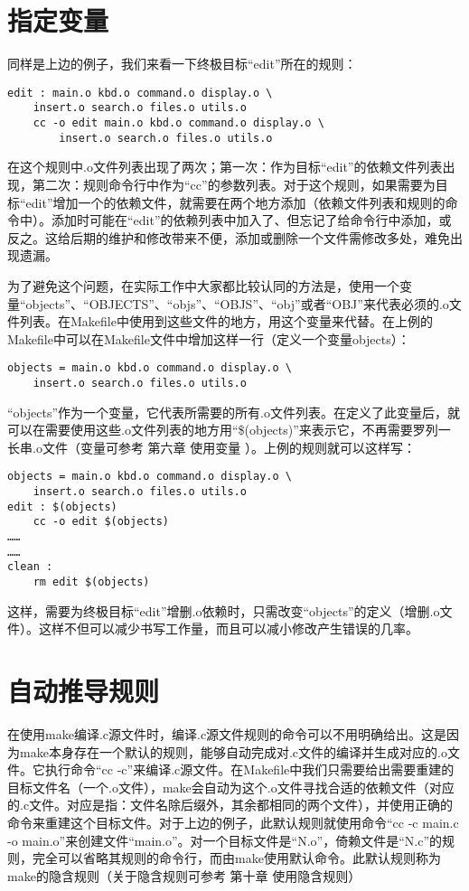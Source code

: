 \section{指定变量}
同样是上边的例子，我们来看一下终极目标“edit”所在的规则：

\begin{Verbatim}[]
edit : main.o kbd.o command.o display.o \
    insert.o search.o files.o utils.o
    cc -o edit main.o kbd.o command.o display.o \
        insert.o search.o files.o utils.o
\end{Verbatim}

在这个规则中.o文件列表出现了两次；第一次：作为目标“edit”的依赖文件列表出现，第二次：规则命令行中作为“cc”的参数列表。对于这个规则，如果需要为目标“edit”增加一个的依赖文件，就需要在两个地方添加（依赖文件列表和规则的命令中）。添加时可能在“edit”的依赖列表中加入了、但忘记了给命令行中添加，或反之。这给后期的维护和修改带来不便，添加或删除一个文件需修改多处，难免出现遗漏。

为了避免这个问题，在实际工作中大家都比较认同的方法是，使用一个变量“objects”、“OBJECTS”、“objs”、“OBJS”、“obj”或者“OBJ”来代表必须的.o文件列表。在Makefile中使用到这些文件的地方，用这个变量来代替。在上例的Makefile中可以在Makefile文件中增加这样一行（定义一个变量objects）：

\begin{Verbatim}[]
objects = main.o kbd.o command.o display.o \
    insert.o search.o files.o utils.o
\end{Verbatim}

“objects”作为一个变量，它代表所需要的所有.o文件列表。在定义了此变量后，就可以在需要使用这些.o文件列表的地方用“\$(objects)”来表示它，不再需要罗列一长串.o文件（变量可参考 第六章 使用变量 ）。上例的规则就可以这样写：

\begin{Verbatim}[]
objects = main.o kbd.o command.o display.o \
    insert.o search.o files.o utils.o
edit : $(objects)
    cc -o edit $(objects)
……
……
clean :
    rm edit $(objects)
\end{Verbatim}


这样，需要为终极目标“edit”增删.o依赖时，只需改变“objects”的定义（增删.o文件）。这样不但可以减少书写工作量，而且可以减小修改产生错误的几率。

\section{自动推导规则}
在使用make编译.c源文件时，编译.c源文件规则的命令可以不用明确给出。这是因为make本身存在一个默认的规则，能够自动完成对.c文件的编译并生成对应的.o文件。它执行命令“cc -c”来编译.c源文件。在Makefile中我们只需要给出需要重建的目标文件名（一个.o文件），make会自动为这个.o文件寻找合适的依赖文件（对应的.c文件。对应是指：文件名除后缀外，其余都相同的两个文件），并使用正确的命令来重建这个目标文件。对于上边的例子，此默认规则就使用命令“cc -c main.c -o main.o”来创建文件“main.o”。对一个目标文件是“N.o”，倚赖文件是“N.c”的规则，完全可以省略其规则的命令行，而由make使用默认命令。此默认规则称为make的隐含规则（关于隐含规则可参考 第十章 使用隐含规则）

